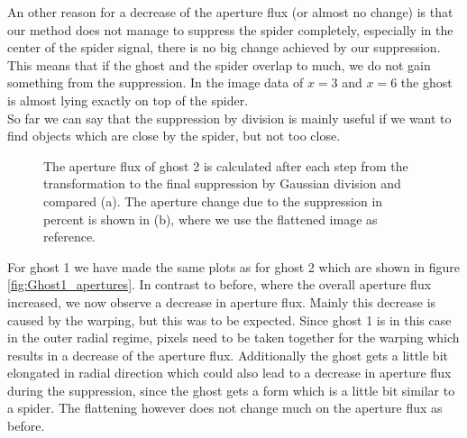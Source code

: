 An other reason for a decrease of the aperture flux (or almost no change) is that our method does not manage to suppress the spider completely, especially in the center of the spider signal, there is no big change achieved by our suppression. This means that if the ghost and the spider overlap to much, we do not gain something from the suppression. In the image data of $x=3$ and $x=6$ the ghost is almost lying exactly on top of the spider.\\
So far we can say that the suppression by division is mainly useful if we want to find objects which are close by the spider, but not too close. \\
\begin{figure}[H]
	\centering
\caption{The aperture flux of ghost 2 is calculated after each step from the transformation to the final suppression by Gaussian division and compared (a). The aperture change due to the suppression in percent is shown in (b), where we use the flattened image as reference.}
\label{fig:Ghost2_apertures}
\end{figure}
For ghost 1 we have made the same plots as for ghost 2 which are shown in figure \ref{fig:Ghost1_apertures}. In contrast to before, where the overall aperture flux increased, we now observe a decrease in aperture flux. Mainly this decrease is caused by the warping, but this was to be expected. Since ghost 1 is in this case in the outer radial regime, pixels need to be taken together for the warping which results in a decrease of the aperture flux. Additionally the ghost gets a little bit elongated in radial direction which could also lead to a decrease in aperture flux during the suppression, since the ghost gets a form which is a little bit similar to a spider. The flattening however does not change much on the aperture flux as before.\\
